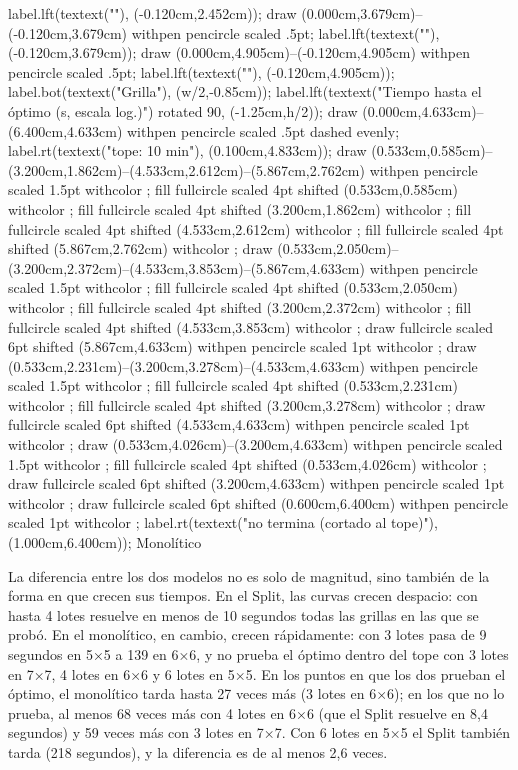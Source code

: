 {{label.lft(textext(""), (-0.120cm,2.452cm));
draw (0.000cm,3.679cm)--(-0.120cm,3.679cm) withpen pencircle scaled .5pt;
label.lft(textext(""), (-0.120cm,3.679cm));
draw (0.000cm,4.905cm)--(-0.120cm,4.905cm) withpen pencircle scaled .5pt;
label.lft(textext(""), (-0.120cm,4.905cm));
label.bot(textext("Grilla"), (w/2,-0.85cm));
label.lft(textext("Tiempo hasta el óptimo (s, escala log.)") rotated 90, (-1.25cm,h/2));
draw (0.000cm,4.633cm)--(6.400cm,4.633cm) withpen pencircle scaled .5pt dashed evenly;
label.rt(textext("\tfxx tope: 10 min"), (0.100cm,4.833cm));
draw (0.533cm,0.585cm)--(3.200cm,1.862cm)--(4.533cm,2.612cm)--(5.867cm,2.762cm) withpen pencircle scaled 1.5pt withcolor ;
fill fullcircle scaled 4pt shifted (0.533cm,0.585cm) withcolor ;
fill fullcircle scaled 4pt shifted (3.200cm,1.862cm) withcolor ;
fill fullcircle scaled 4pt shifted (4.533cm,2.612cm) withcolor ;
fill fullcircle scaled 4pt shifted (5.867cm,2.762cm) withcolor ;
draw (0.533cm,2.050cm)--(3.200cm,2.372cm)--(4.533cm,3.853cm)--(5.867cm,4.633cm) withpen pencircle scaled 1.5pt withcolor ;
fill fullcircle scaled 4pt shifted (0.533cm,2.050cm) withcolor ;
fill fullcircle scaled 4pt shifted (3.200cm,2.372cm) withcolor ;
fill fullcircle scaled 4pt shifted (4.533cm,3.853cm) withcolor ;
draw fullcircle scaled 6pt shifted (5.867cm,4.633cm) withpen pencircle scaled 1pt withcolor ;
draw (0.533cm,2.231cm)--(3.200cm,3.278cm)--(4.533cm,4.633cm) withpen pencircle scaled 1.5pt withcolor ;
fill fullcircle scaled 4pt shifted (0.533cm,2.231cm) withcolor ;
fill fullcircle scaled 4pt shifted (3.200cm,3.278cm) withcolor ;
draw fullcircle scaled 6pt shifted (4.533cm,4.633cm) withpen pencircle scaled 1pt withcolor ;
draw (0.533cm,4.026cm)--(3.200cm,4.633cm) withpen pencircle scaled 1.5pt withcolor ;
fill fullcircle scaled 4pt shifted (0.533cm,4.026cm) withcolor ;
draw fullcircle scaled 6pt shifted (3.200cm,4.633cm) withpen pencircle scaled 1pt withcolor ;
draw fullcircle scaled 6pt shifted (0.600cm,6.400cm) withpen pencircle scaled 1pt withcolor ;
label.rt(textext("\tfx no termina (cortado al tope)"), (1.000cm,6.400cm));
\stopMPcode}{Monolítico}
\stopcombination}

La diferencia entre los dos modelos no es solo de magnitud, sino también de
la forma en que crecen sus tiempos. En el Split, las curvas crecen despacio:
con hasta 4 lotes resuelve en menos de 10 segundos todas las grillas en las
que se probó. En el
monolítico, en cambio, crecen rápidamente: con 3 lotes pasa de 9 segundos en
5×5 a 139 en 6×6, y no prueba el óptimo dentro del tope con 3 lotes en 7×7, 4
lotes en 6×6 y 6 lotes en 5×5. En los puntos en que los dos prueban el
óptimo, el monolítico tarda hasta 27 veces más (3 lotes en 6×6); en los que
no lo prueba, al menos 68 veces más con 4 lotes en 6×6 (que el Split resuelve
en 8,4 segundos) y 59 veces más con 3 lotes en 7×7. Con 6 lotes en 5×5 el
Split también tarda (218 segundos), y la diferencia es de al menos 2,6
veces.

